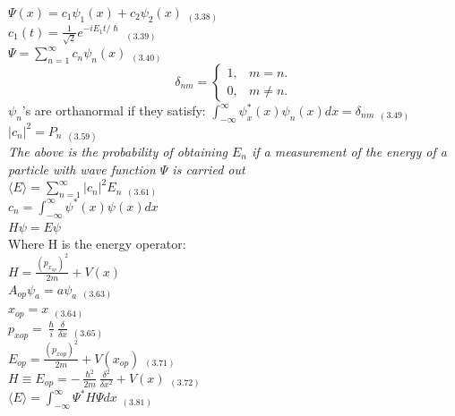 \documentclass[0pt]{report}
\begin{document}
\begin{multicols}{3}
\begin{flushleft}
$\Psi(x)=c_1\psi_1(x)+c_2\psi_2(x)$ $_{(3.38)}$\\
$c_1(t)=\frac{1}{\sqrt{2}}e^{-iE_1t/\hslash}$ $_{(3.39)}$\\
$\Psi=\sum_{n=1}^{\infty}c_n\psi_n(x)$ $_{(3.40)}$\\
\begin{equation*}
  \delta_{nm}=\begin{cases}
    1, & \text{$m=n$}.\\
    0, & \text{$m\neq n$}.
  \end{cases}
\end{equation*}
$\psi_n$'s are orthanormal if they satisfy:
$\int_{-\infty}^{\infty}\psi_x^*(x)\psi_n(x)dx=\delta_{nm}$ $_{(3.49)}$\\
$|c_n|^2=P_n$ $_{(3.59)}$\\
\textit{The above is the probability of obtaining $E_n$ if a measurement of the energy of a particle with wave function $\Psi$ is carried out}\\
$\langle E\rangle=\sum_{n=1}^{\infty}|c_n|^2E_n$ $_{(3.61)}$\\
$c_n=\int_{-\infty}^{\infty}\psi^*(x)\psi(x)dx$\\
$H\psi=E\psi$\\
Where H is the energy operator:\\
$H=\frac{(p_{x_{op}})^2}{2m}+V(x)$\\
$A_{op}\psi_a=a\psi_a$ $_{(3.63)}$\\
$x_{op}=x$ $_{(3.64)}$\\
$p_{xop}=\frac{\hslash}{i}\frac{\delta}{\delta x}$ $_{(3.65)}$\\
$E_{op}=\frac{(p_{xop})^2}{2m}+V(x_{op})$ $_{(3.71)}$\\
$H\equiv E_{op}=-\frac{\hslash^2}{2m}\frac{\delta^2}{\delta x^2}+V(x)$ $_{(3.72)}$\\
$\langle E\rangle=\int_{-\infty}^{\infty}\Psi^*H\Psi dx$ $_{(3.81)}$\\


\end{flushleft}
\end{multicols}
\end{document}
